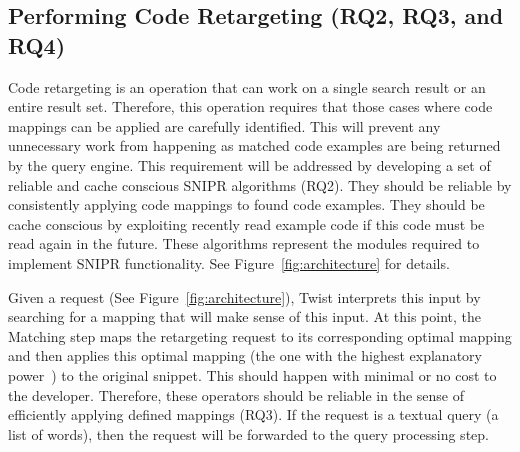 \documentclass[conference]{IEEEtran}
\begin{document}
\subsection{Performing Code Retargeting (RQ2, RQ3, and RQ4)}
\label{sec:restqs}

Code retargeting is an operation that can work on a single search result or an entire result set. Therefore, this operation requires that those cases where code mappings can be applied are carefully identified. This will prevent any unnecessary work from happening as matched code examples are being returned by the query engine. This requirement will be addressed by developing a set of reliable and cache conscious \uppercase{SnipR} algorithms (RQ2). They should be reliable by consistently applying code mappings to found code examples. They should be cache conscious by exploiting recently read example code if this code must be read again in the future. These algorithms represent the modules required to implement SNIPR functionality. See Figure~\ref{fig:architecture} for details.


Given a request (See Figure~\ref{fig:architecture}), Twist interprets this input by searching for a mapping that will make sense of this input. At this point, the Matching step maps the retargeting request to its corresponding optimal mapping and then applies this optimal mapping (the one with the highest explanatory power~\cite{Little:2008hr}) to the original snippet. This should happen with minimal or no cost to the developer. Therefore, these operators should be reliable in the sense of efficiently applying defined mappings (RQ3). If the request is a textual query (a list of words), then the request will be forwarded to the query processing step.
\end{document}
